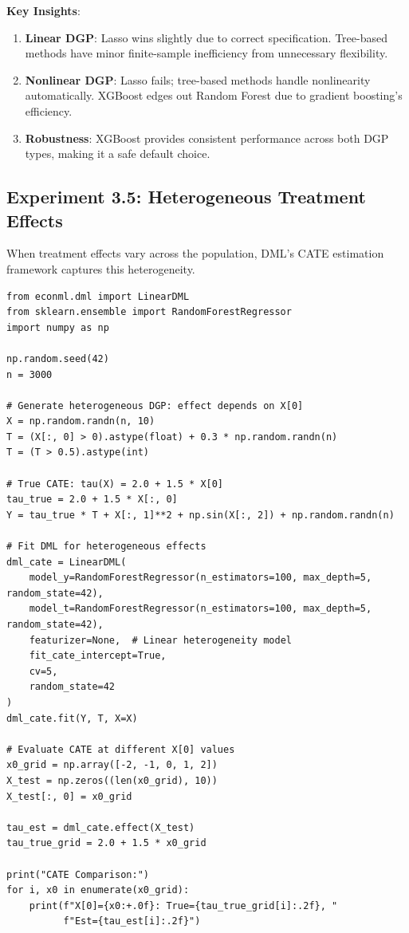 %

\textbf{Key Insights}:

\begin{enumerate}
\item \textbf{Linear DGP}: Lasso wins slightly due to correct specification. Tree-based methods have minor finite-sample inefficiency from unnecessary flexibility.

\item \textbf{Nonlinear DGP}: Lasso fails; tree-based methods handle nonlinearity automatically. XGBoost edges out Random Forest due to gradient boosting's efficiency.

\item \textbf{Robustness}: XGBoost provides consistent performance across both DGP types, making it a safe default choice.
\end{enumerate}

%

\subsection{Experiment 3.5: Heterogeneous Treatment Effects}

When treatment effects vary across the population, DML's CATE estimation framework captures this heterogeneity.

\begin{verbatim}
from econml.dml import LinearDML
from sklearn.ensemble import RandomForestRegressor
import numpy as np

np.random.seed(42)
n = 3000

# Generate heterogeneous DGP: effect depends on X[0]
X = np.random.randn(n, 10)
T = (X[:, 0] > 0).astype(float) + 0.3 * np.random.randn(n)
T = (T > 0.5).astype(int)

# True CATE: tau(X) = 2.0 + 1.5 * X[0]
tau_true = 2.0 + 1.5 * X[:, 0]
Y = tau_true * T + X[:, 1]**2 + np.sin(X[:, 2]) + np.random.randn(n)

# Fit DML for heterogeneous effects
dml_cate = LinearDML(
    model_y=RandomForestRegressor(n_estimators=100, max_depth=5, random_state=42),
    model_t=RandomForestRegressor(n_estimators=100, max_depth=5, random_state=42),
    featurizer=None,  # Linear heterogeneity model
    fit_cate_intercept=True,
    cv=5,
    random_state=42
)
dml_cate.fit(Y, T, X=X)

# Evaluate CATE at different X[0] values
x0_grid = np.array([-2, -1, 0, 1, 2])
X_test = np.zeros((len(x0_grid), 10))
X_test[:, 0] = x0_grid

tau_est = dml_cate.effect(X_test)
tau_true_grid = 2.0 + 1.5 * x0_grid

print("CATE Comparison:")
for i, x0 in enumerate(x0_grid):
    print(f"X[0]={x0:+.0f}: True={tau_true_grid[i]:.2f}, "
          f"Est={tau_est[i]:.2f}")
\end{verbatim}

